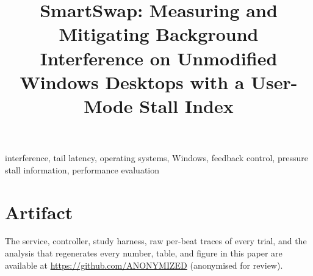 \documentclass[conference]{IEEEtran}
\begin{document}
\title{SmartSwap: Measuring and Mitigating Background Interference on Unmodified Windows Desktops with a User-Mode Stall Index}

\author{
}

\maketitle



\begin{IEEEkeywords}
interference, tail latency, operating systems, Windows, feedback control, pressure stall information, performance evaluation
\end{IEEEkeywords}









\section*{Artifact}
The service, controller, study harness, raw per-beat traces of every trial, and the analysis that regenerates every number, table, and figure in this paper are available at \url{https://github.com/ANONYMIZED} (anonymised for review).



\end{document}
